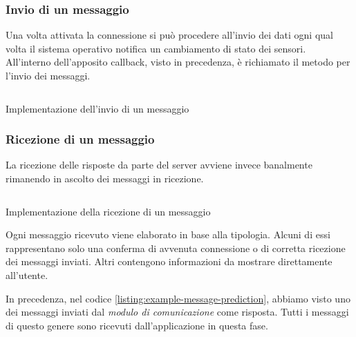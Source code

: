 \subsubsection{Invio di un messaggio}
Una volta attivata la connessione si può procedere all'invio dei dati ogni qual volta il sistema 
operativo notifica un cambiamento di stato dei sensori. All'interno dell'apposito callback, visto in precedenza, è
richiamato il metodo per l'invio dei messaggi.
\begin{listing}[H] 
    \inputminted[frame=single,framesep=10pt]{java}{assets/snippets/app/connection/send.java}
    \caption{Implementazione dell'invio di un messaggio}
\end{listing}

\newpage
\subsubsection{Ricezione di un messaggio}
La ricezione delle risposte da parte del server avviene invece banalmente rimanendo in ascolto 
dei messaggi in ricezione.
\begin{listing}[H] 
    \inputminted[frame=single,framesep=10pt]{java}{assets/snippets/app/connection/receive.java}
    \caption{Implementazione della ricezione di un messaggio}
\end{listing}
\vspace{5mm} %
\noindent Ogni messaggio ricevuto viene elaborato in base alla tipologia. Alcuni di essi rappresentano solo una conferma di avvenuta 
connessione o di corretta ricezione dei messaggi inviati. Altri contengono informazioni da mostrare direttamente all'utente.

\vspace{5mm} %
In precedenza, nel codice \ref{listing:example-message-prediction}, abbiamo visto uno dei messaggi inviati dal \textit{modulo di comunicazione} come risposta. 
Tutti i messaggi di questo genere sono ricevuti dall'applicazione in questa fase.